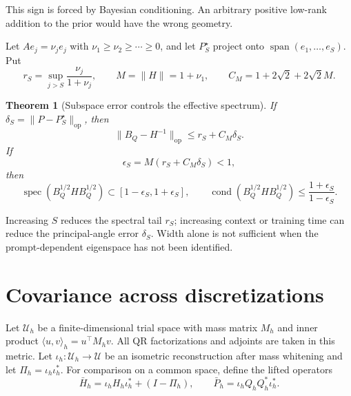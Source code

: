 \documentclass[11pt,a4paper]{article}
\numberwithin{equation}{section}
\newtheorem{theorem}{Theorem}[section]
\theoremstyle{definition}
\theoremstyle{remark}
\newcommand{\calU}{\mathcal U}
\newcommand{\op}{\mathrm{op}}
\newcommand{\spec}{\operatorname{spec}}
\newcommand{\Span}{\operatorname{span}}
\begin{document}
This sign is forced by Bayesian conditioning.  An arbitrary positive
low-rank addition to the prior would have the wrong geometry.

Let $A e_j=\nu_je_j$ with $\nu_1\ge\nu_2\ge\cdots\ge0$, and let
$P_S^\star$ project onto $\Span(e_1,\ldots,e_S)$.  Put
\begin{equation}
 r_S=\sup_{j>S}\frac{\nu_j}{1+\nu_j},
 \qquad M=\|H\|=1+\nu_1,
 \qquad
 C_M=1+2\sqrt2+2\sqrt2M.
 \label{eq:tail-constants}
\end{equation}

\begin{theorem}[Subspace error controls the effective spectrum]
\label{thm:subspace-spectrum}
If $\delta_S=\|P-P_S^\star\|_\op$, then
\begin{equation}
 \|B_Q-H^{-1}\|_\op\le r_S+C_M\delta_S.
 \label{eq:inverse-approximation}
\end{equation}
If
\begin{equation}
 \epsilon_S=M(r_S+C_M\delta_S)<1,
 \label{eq:epsilon-spectrum}
\end{equation}
then
\begin{equation}
 \spec(B_Q^{1/2}HB_Q^{1/2})
 \subset[1-\epsilon_S,1+\epsilon_S],
 \qquad
 \operatorname{cond}(B_Q^{1/2}HB_Q^{1/2})
 \le\frac{1+\epsilon_S}{1-\epsilon_S}.
 \label{eq:spectral-equivalence}
\end{equation}
\end{theorem}

Increasing $S$ reduces the
spectral tail $r_S$; increasing context or training time can reduce the
principal-angle error $\delta_S$.  Width alone is not sufficient when the
prompt-dependent eigenspace has not been identified.

\section{Covariance across discretizations}
\label{sec:discretization}

Let $\calU_h$ be a finite-dimensional trial space with mass matrix $M_h$ and
inner product $\langle u,v\rangle_h=u^\top M_hv$.  All QR factorizations and
adjoints are taken in this metric.  Let $\iota_h:\calU_h\to\calU$ be an
isometric reconstruction after mass whitening and let $\Pi_h=\iota_h\iota_h^*$.
For comparison on a common space, define the lifted operators
\begin{equation}
 \bar H_h=\iota_hH_h\iota_h^*+(I-\Pi_h),
 \qquad
 \bar P_h=\iota_hQ_hQ_h^*\iota_h^*.
 \label{eq:lifted-operators}
\end{equation}
\end{document}

